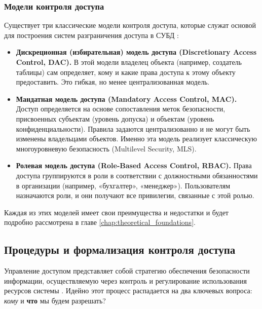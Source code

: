 \subsubsection{Модели контроля доступа}
Существует три классические модели контроля доступа, которые служат основой для построения систем разграничения доступа в СУБД \autocite{Tanenbaum}:
\begin{itemize}
    \item \textbf{Дискреционная (избирательная) модель доступа (Discretionary Access Control, DAC).} В этой модели владелец объекта (например, создатель таблицы) сам определяет, кому и какие права доступа к этому объекту предоставить. Это гибкая, но менее централизованная модель.
    \item \textbf{Мандатная модель доступа (Mandatory Access Control, MAC).} Доступ определяется на основе сопоставления меток безопасности, присвоенных субъектам (уровень допуска) и объектам (уровень конфиденциальности). Правила задаются централизованно и не могут быть изменены владельцами объектов. Именно эта модель реализует классическую многоуровневую безопасность (Multilevel Security, MLS).
    \item \textbf{Ролевая модель доступа (Role-Based Access Control, RBAC).} Права доступа группируются в роли в соответствии с должностными обязанностями в организации (например, «бухгалтер», «менеджер»). Пользователям назначаются роли, и они получают все привилегии, связанные с этой ролью.
\end{itemize}
Каждая из этих моделей имеет свои преимущества и недостатки и будет подробно рассмотрена в главе \ref{chap:theoretical_foundations}.

\subsection{Процедуры и формализация контроля доступа}
Управление доступом представляет собой стратегию обеспечения безопасности информации, осуществляемую через контроль и регулирование использования ресурсов системы \autocite[с. 36]{Skakun}. Идейно этот процесс распадается на два ключевых вопроса: \textit{кому} и \textbf{что} мы будем разрешать?

